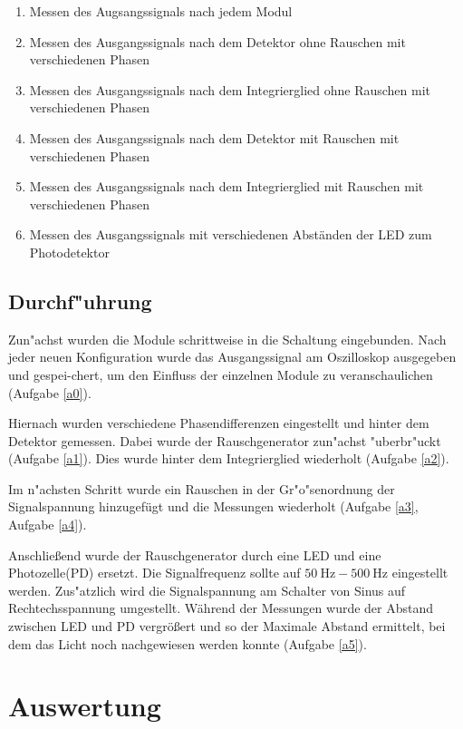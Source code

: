 \documentclass{scrartcl}
\begin{document}
			\begin{enumerate}
				\item \label{a0} Messen des Augsangssignals nach jedem Modul
				\item \label{a1} Messen des Ausgangssignals nach dem Detektor ohne Rauschen mit verschiedenen Phasen
				\item \label{a2} Messen des Ausgangssignals nach dem Integrierglied ohne Rauschen mit verschiedenen Phasen
				\item \label{a3} Messen des Ausgangssignals nach dem Detektor mit Rauschen mit verschiedenen Phasen
				\item \label{a4} Messen des Ausgangssignals nach dem Integrierglied mit Rauschen mit verschiedenen Phasen
				\item \label{a5} Messen des Ausgangssignals mit verschiedenen Abständen der LED zum Photodetektor
			\end{enumerate}

		\subsection{Durchf"uhrung}

			Zun"achst wurden die Module schrittweise in die Schaltung eingebunden.
			Nach jeder neuen Konfiguration wurde das Ausgangssignal am Oszilloskop ausgegeben und gespei-chert,
			um den Einfluss der einzelnen Module zu veranschaulichen (Aufgabe \ref{a0}).

			Hiernach wurden verschiedene Phasendifferenzen eingestellt und hinter dem Detektor gemessen.
			Dabei wurde der Rauschgenerator zun"achst "uberbr"uckt (Aufgabe \ref{a1}).
			Dies wurde hinter dem Integrierglied wiederholt (Aufgabe \ref{a2}).

			Im n"achsten Schritt wurde ein Rauschen in der Gr"o"senordnung der Signalspannung hinzugefügt und die Messungen
			wiederholt (Aufgabe \ref{a3}, Aufgabe \ref{a4}).

			Anschließend wurde der Rauschgenerator durch eine LED und eine Photozelle(PD) ersetzt.
			Die Signalfrequenz sollte auf $\SI{50}{\hertz}-\SI{500}{\hertz}$ eingestellt werden.
			Zus"atzlich wird die Signalspannung am Schalter von Sinus auf Rechtechsspannung umgestellt.
			Während der Messungen wurde der Abstand zwischen LED und PD vergrößert und so der Maximale Abstand ermittelt,
			bei dem das Licht noch nachgewiesen werden konnte (Aufgabe \ref{a5}).

	\section{Auswertung}
\end{document}
